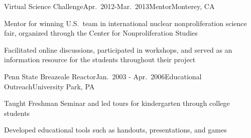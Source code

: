
\begin{rSubsection}{Virtual Science Challenge}{Apr.\ 2012-Mar.\ 2013}{Mentor}{Monterey, CA}
\item Mentor for winning U.S.\ team in international nuclear nonproliferation science fair, organized through the Center for Nonproliferation Studies
\item Facilitated online discussions, participated in workshops, and served as an information resource for the students throughout their project
\end{rSubsection}


\begin{rSubsection}{Penn State Breazeale Reactor}{Jan.\ 2003 - Apr.\ 2006}{Educational Outreach}{University Park, PA}
\item Taught Freshman Seminar and led tours for kindergarten through college students
\item Developed educational tools such as handouts, presentations, and games
\end{rSubsection}

